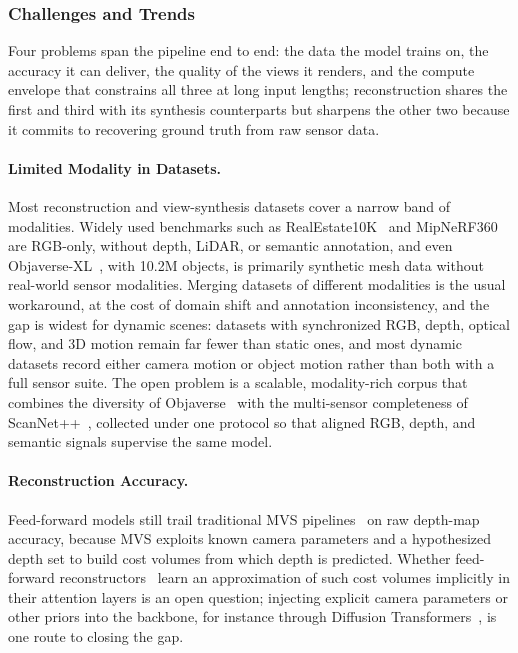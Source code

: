 \subsubsection{Challenges and Trends}
\label{subsubsec:p3_s8_2_3_challenges}

Four problems span the pipeline end to end: the data the model trains on, the accuracy it can deliver, the quality of the views it renders, and the compute envelope that constrains all three at long input lengths; reconstruction shares the first and third with its synthesis counterparts but sharpens the other two because it commits to recovering ground truth from raw sensor data.

\paragraph{Limited Modality in Datasets.}
Most reconstruction and view-synthesis datasets cover a narrow band of modalities.
Widely used benchmarks such as RealEstate10K~\cite{zhou2018stereo} and MipNeRF360~\cite{barron2022mip} are RGB-only, without depth, LiDAR, or semantic annotation, and even Objaverse-XL~\cite{deitke2023objaversexl}, with 10.2M objects, is primarily synthetic mesh data without real-world sensor modalities.
Merging datasets of different modalities is the usual workaround, at the cost of domain shift and annotation inconsistency, and the gap is widest for dynamic scenes: datasets with synchronized RGB, depth, optical flow, and 3D motion remain far fewer than static ones, and most dynamic datasets record either camera motion or object motion rather than both with a full sensor suite.
The open problem is a scalable, modality-rich corpus that combines the diversity of Objaverse~\cite{deitke2023objaverse} with the multi-sensor completeness of ScanNet++~\cite{yeshwanth2023scannet++}, collected under one protocol so that aligned RGB, depth, and semantic signals supervise the same model.

\paragraph{Reconstruction Accuracy.}
Feed-forward models still trail traditional MVS pipelines~\cite{zhang2023geomvsnet, zhang2025advances} on raw depth-map accuracy, because MVS exploits known camera parameters and a hypothesized depth set to build cost volumes from which depth is predicted.
Whether feed-forward reconstructors~\cite{yang2025fast3r, wang2025vggt} learn an approximation of such cost volumes implicitly in their attention layers is an open question; injecting explicit camera parameters or other priors into the backbone, for instance through Diffusion Transformers~\cite{peebles2023dit}, is one route to closing the gap.

